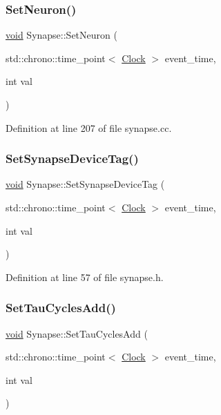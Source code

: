 \subsubsection{\texorpdfstring{Set\+Neuron()}{SetNeuron()}}
{\footnotesize\ttfamily \mbox{\hyperlink{glad_8h_a950fc91edb4504f62f1c577bf4727c29}{void}} Synapse\+::\+Set\+Neuron (\begin{DoxyParamCaption}\item[{std\+::chrono\+::time\+\_\+point$<$ \mbox{\hyperlink{universe_8h_a0ef8d951d1ca5ab3cfaf7ab4c7a6fd80}{Clock}} $>$}]{event\+\_\+time,  }\item[{int}]{val }\end{DoxyParamCaption})}



Definition at line 207 of file synapse.\+cc.

\mbox{\label{class_synapse_a702c08b1ee4389382a5890d8c19aee9c}} 
\subsubsection{\texorpdfstring{Set\+Synapse\+Device\+Tag()}{SetSynapseDeviceTag()}}
{\footnotesize\ttfamily \mbox{\hyperlink{glad_8h_a950fc91edb4504f62f1c577bf4727c29}{void}} Synapse\+::\+Set\+Synapse\+Device\+Tag (\begin{DoxyParamCaption}\item[{std\+::chrono\+::time\+\_\+point$<$ \mbox{\hyperlink{universe_8h_a0ef8d951d1ca5ab3cfaf7ab4c7a6fd80}{Clock}} $>$}]{event\+\_\+time,  }\item[{int}]{val }\end{DoxyParamCaption})\hspace{0.3cm}{\ttfamily [inline]}}



Definition at line 57 of file synapse.\+h.

\mbox{\label{class_synapse_afbd7a2e7e6353b3e743ec100fe615e84}} 
\subsubsection{\texorpdfstring{Set\+Tau\+Cycles\+Add()}{SetTauCyclesAdd()}}
{\footnotesize\ttfamily \mbox{\hyperlink{glad_8h_a950fc91edb4504f62f1c577bf4727c29}{void}} Synapse\+::\+Set\+Tau\+Cycles\+Add (\begin{DoxyParamCaption}\item[{std\+::chrono\+::time\+\_\+point$<$ \mbox{\hyperlink{universe_8h_a0ef8d951d1ca5ab3cfaf7ab4c7a6fd80}{Clock}} $>$}]{event\+\_\+time,  }\item[{int}]{val }\end{DoxyParamCaption})\hspace{0.3cm}{\ttfamily [inline]}}



